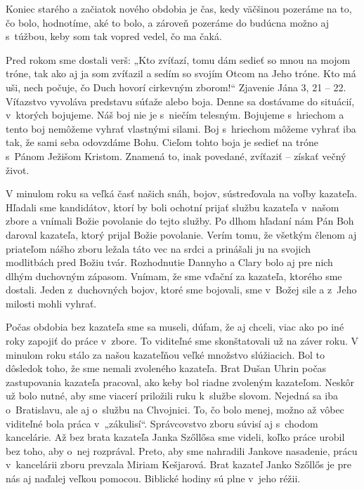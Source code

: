 


Koniec starého a začiatok nového obdobia je čas, kedy väčšinou pozeráme na to, čo bolo, hodnotíme, aké to bolo, a zároveň pozeráme do budúcna možno aj s~túžbou, keby som tak vopred vedel, čo ma čaká.

Pred rokom sme dostali verš: „Kto zvíťazí, tomu dám sedieť so mnou na mojom tróne, tak ako aj ja som zvíťazil a sedím so svojím Otcom na Jeho tróne. Kto má uši, nech počuje, čo Duch hovorí cirkevným zborom!“ Zjavenie Jána 3, 21 -- 22. Víťazstvo vyvoláva predstavu súťaže alebo boja. Denne sa dostávame do situácií, v~ktorých bojujeme. Náš boj nie je s~niečím telesným. Bojujeme s~hriechom a tento boj nemôžeme vyhrať vlastnými silami. Boj s~hriechom môžeme vyhrať iba tak, že sami seba odovzdáme Bohu. Cieľom tohto boja je sedieť na tróne s~Pánom Ježišom Kristom. Znamená to, inak povedané, zvíťaziť -- získať večný život.

V minulom roku sa veľká časť našich snáh, bojov, sústreďovala na voľby kazateľa.  Hľadali sme kandidátov, ktorí by boli ochotní prijať službu kazateľa v~našom zbore a vnímali Božie povolanie do tejto služby. Po dlhom  hľadaní nám Pán Boh daroval kazateľa, ktorý prijal Božie povolanie. Verím tomu, že všetkým členom aj priateľom nášho zboru ležala táto vec na srdci a prinášali ju na svojich modlitbách pred Božiu tvár. Rozhodnutie Dannyho a Clary bolo aj pre nich dlhým duchovným zápasom. Vnímam, že sme vďační za kazateľa, ktorého sme dostali. Jeden z~duchovných bojov, ktoré sme bojovali, sme v~Božej sile a z~Jeho milosti mohli vyhrať.

Počas obdobia bez kazateľa sme sa museli, dúfam, že aj chceli, viac ako po iné roky zapojiť do práce v~zbore. To viditeľné sme skonštatovali už na záver roku. V minulom roku stálo za našou kazateľňou veľké množstvo slúžiacich. Bol to dôsledok toho, že sme nemali zvoleného kazateľa. Brat Dušan Uhrin počas zastupovania kazateľa pracoval, ako keby bol riadne zvoleným kazateľom. Neskôr už bolo nutné, aby sme viacerí priložili ruku k~službe slovom. Nejedná sa iba o~Bratislavu, ale aj o~službu na Chvojnici. To, čo bolo menej, možno až vôbec viditeľné bola práca v~„zákulisí“.  Správcovstvo zboru súvisí aj s~chodom kancelárie. Až bez brata kazateľa Janka Szőllősa sme videli, koľko práce urobil bez toho, aby o~nej rozprával. Preto, aby sme nahradili Jankove nasadenie, prácu v~kancelárii zboru prevzala Miriam Kešjarová. Brat kazateľ Janko Szőllős je pre nás aj naďalej veľkou pomocou. Biblické hodiny sú plne v~jeho réžii.

